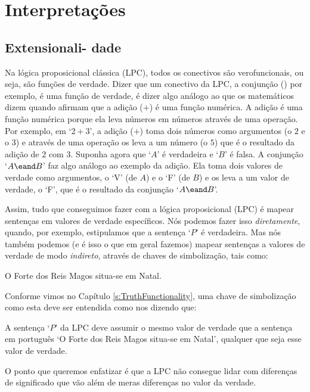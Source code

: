 \part{Interpretações}
\label{ch.semantics}


\chapter[Extensionalidade]{Extensionali- dade}\label{s:Interpretations}

Na lógica proposicional clássica (LPC), todos os conectivos são verofuncionais, ou seja, são funções de verdade.
Dizer que um conectivo da LPC, a conjunção (\eand) por exemplo, é uma função de verdade, é dizer algo análogo ao que os matemáticos dizem quando afirmam que a adição ($+$) é uma função numérica.
A adição é uma função numérica porque ela leva números em números através de uma operação.
Por exemplo, em  `$2+3$', a adição ($+$) toma dois números como argumentos (o $2$ e o $3$) e através de uma operação os leva a um número (o $5$) que é o resultado da adição de $2$ com $3$.
Suponha agora que `$A$' é verdadeira e `$B$' é falsa. A conjunção `$A\eand B$' faz algo análogo ao exemplo da adição.
Ela toma dois valores de verdade como argumentos, o `V' (de $A$) e o `F' (de $B$) e os leva a um valor de verdade, o `F', que é o resultado da conjunção `$A\eand B$'.

Assim, tudo que conseguimos fazer com a lógica proposicional (LPC) é mapear sentenças em valores de verdade específicos.
Nós podemos fazer isso \emph{diretamente}, quando, por exemplo, estipulamos que a sentença `$P$' é verdadeira.
Mas nós também podemos (e é isso o que em geral fazemos) mapear sentenças a valores de verdade de modo \emph{indireto}, através de chaves de simbolização, tais como:
	\begin{ekey}
		\item[P] O Forte dos Reis Magos situa-se em Natal.
	\end{ekey}
Conforme vimos no Capítulo \ref{s:TruthFunctionality}, uma chave de simbolização como esta deve ser entendida como nos dizendo que:
	\begin{ebullet}
		\item A sentença `$P$' da LPC deve assumir o mesmo valor de verdade que a sentença em português `O Forte dos Reis Magos situa-se em Natal', qualquer que seja esse valor de verdade.
	\end{ebullet}
O ponto que queremos enfatizar é que a LPC não consegue lidar com diferenças de significado que vão além de meras diferenças no valor da verdade.


